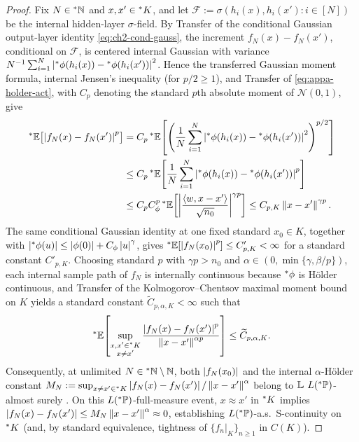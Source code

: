 \begin{proof}
Fix $N \in {}^*\mathbb{N}$ and $x, x' \in {}^*K$, and let $\mathcal{F} := \sigma(h_i(x), h_i(x') : i \in [N])$ be the internal hidden-layer $\sigma$-field. By Transfer of the conditional Gaussian output-layer identity \eqref{eq:ch2-cond-gauss},
the increment $f_N(x) - f_N(x')$, conditional on $\mathcal{F}$, is centered internal Gaussian with variance $N^{-1}\sum_{i=1}^N \left\lvert {}^*\phi(h_i(x)) - {}^*\phi(h_i(x')) \right\rvert^2$. Hence the transferred Gaussian moment formula, internal Jensen's inequality (for $p/2 \ge 1$), and Transfer of \eqref{eq:appa-holder-act}, with $C_p$ denoting the standard $p$th absolute moment of $\mathcal{N}(0, 1)$, give
\begin{equation}
\label{eq:appa-holder-proof}
\begin{aligned}
{}^*\mathbb{E}\bigl[\left\lvert f_N(x) - f_N(x') \right\rvert^p\bigr]
&= C_p\,{}^*\mathbb{E}\!\left[\left(\frac{1}{N}\sum_{i=1}^N \left\lvert {}^*\phi(h_i(x)) - {}^*\phi(h_i(x')) \right\rvert^2\right)^{p/2}\right] \\
&\le C_p\,{}^*\mathbb{E}\!\left[\frac{1}{N}\sum_{i=1}^N \left\lvert {}^*\phi(h_i(x)) - {}^*\phi(h_i(x')) \right\rvert^p\right] \\
&\le C_p C_\phi^p\,{}^*\mathbb{E}\!\left[\left\lvert \frac{\left\langle w, x - x' \right\rangle}{\sqrt{n_0}} \right\rvert^{\gamma p}\right]
\le C_{p,K}\left\lVert x - x' \right\rVert^{\gamma p}.
\end{aligned}
\end{equation}
The same conditional Gaussian identity at one fixed standard $x_0 \in K$, together with $\left\lvert {}^*\phi(u) \right\rvert \le \left\lvert \phi(0) \right\rvert + C_\phi\left\lvert u \right\rvert^\gamma$, gives ${}^*\mathbb{E}[\left\lvert f_N(x_0) \right\rvert^p] \le C'_{p,K} < \infty$ for a standard constant $C'_{p,K}$. Choosing standard $p$ with $\gamma p > n_0$ and $\alpha \in (0, \min\{\gamma, \beta/p\})$, each internal sample path of $f_N$ is internally continuous because ${}^*\phi$ is H\"older continuous, and Transfer of the Kolmogorov--Chentsov maximal moment bound on $K$ yields a standard constant $\widetilde{C}_{p,\alpha,K} < \infty$ such that
\[
{}^*\mathbb{E}\!\left[\sup_{\substack{x, x' \in {}^*K \\ x \neq x'}} \frac{\left\lvert f_N(x) - f_N(x') \right\rvert^p}{\left\lVert x - x' \right\rVert^{\alpha p}}\right] \le \widetilde{C}_{p,\alpha,K}.
\]
Consequently, at unlimited $N \in {}^*\mathbb{N} \setminus \mathbb{N}$, both $\left\lvert f_N(x_0) \right\rvert$ and the internal $\alpha$-H\"older constant $M_N := \sup_{x \neq x' \in {}^*K} \left\lvert f_N(x) - f_N(x') \right\rvert/\left\lVert x - x' \right\rVert^\alpha$ belong to $\mathbb{L}$ $L({}^*\mathbb{P})$-almost surely \cite{loeb1975conversion,cutland2000loeb}. On this $L({}^*\mathbb{P})$-full-measure event, $x \approx x'$ in ${}^*K$ implies $\left\lvert f_N(x) - f_N(x') \right\rvert \le M_N\left\lVert x - x' \right\rVert^\alpha \approx 0$, establishing $L({}^*\mathbb{P})$-a.s.\ S-continuity on ${}^*K$ (and, by standard equivalence, tightness of $\{f_n|_K\}_{n \ge 1}$ in $C(K)$).
\end{proof}

